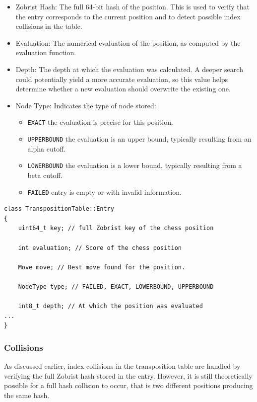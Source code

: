 \begin{itemize}
  \item Zobrist Hash: The full 64-bit hash of the position. This is used to verify that the entry corresponds to the current position and to detect possible index collisions in the table.
  \item Evaluation: The numerical evaluation of the position, as computed by the evaluation function.
  \item Depth: The depth at which the evaluation was calculated. A deeper search could potentially yield a more accurate evaluation, so this value helps determine whether a new evaluation should overwrite the existing one.
  \item Node Type: Indicates the type of node stored:
  \begin{itemize}
    \item \texttt{EXACT} the evaluation is precise for this position.
    \item \texttt{UPPERBOUND} the evaluation is an upper bound, typically resulting from an alpha cutoff.
    \item \texttt{LOWERBOUND} the evaluation is a lower bound, typically resulting from a beta cutoff.
    \item \texttt{FAILED} entry is empty or with invalid information.
  \end{itemize}
\end{itemize}

\begin{lstlisting}[breaklines=true, frame=single, caption={Code example transposition table entry}, label={lst:transposition_table_entry}]
class TranspositionTable::Entry
{
    uint64_t key; // full Zobrist key of the chess position

    int evaluation; // Score of the chess position

    Move move; // Best move found for the position.

    NodeType type; // FAILED, EXACT, LOWERBOUND, UPPERBOUND

    int8_t depth; // At which the position was evaluated
...
}
\end{lstlisting}

\subsubsection{Collisions}

As discussed earlier, index collisions in the transposition table are handled by verifying the full Zobrist hash stored in the entry. However, it is still theoretically possible for a full hash collision to occur, that is two different positions producing the same hash.

